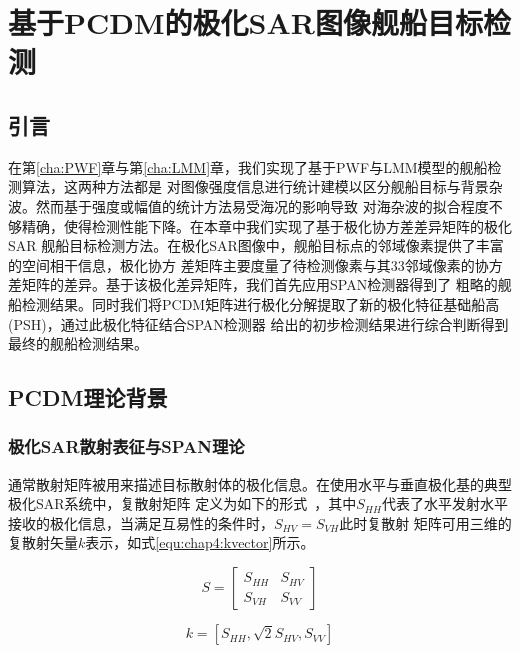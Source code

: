 \chapter{基于PCDM的极化SAR图像舰船目标检测}
\label{cha:PCDM}

\section{引言}
\label{sec:chap4:sec1}
在第\ref{cha:PWF}章与第\ref{cha:LMM}章，我们实现了基于PWF与LMM模型的舰船检测算法，这两种方法都是
对图像强度信息进行统计建模以区分舰船目标与背景杂波。然而基于强度或幅值的统计方法易受海况的影响导致
对海杂波的拟合程度不够精确，使得检测性能下降。在本章中我们实现了基于极化协方差差异矩阵的极化SAR
舰船目标检测方法。在极化SAR图像中，舰船目标点的邻域像素提供了丰富的空间相干信息，极化协方
差矩阵主要度量了待检测像素与其3\times 3邻域像素的协方差矩阵的差异。基于该极化差异矩阵，我们首先应用SPAN检测器得到了
粗略的舰船检测结果。同时我们将PCDM矩阵进行极化分解提取了新的极化特征基础船高(PSH)，通过此极化特征结合SPAN检测器
给出的初步检测结果进行综合判断得到最终的舰船检测结果。




\section{PCDM理论背景}
\label{sec:chap4:sec2}
\subsection{极化SAR散射表征与SPAN理论}
    通常散射矩阵被用来描述目标散射体的极化信息。在使用水平与垂直极化基的典型极化SAR系统中，复散射矩阵
    定义为如下的形式~\cite{book}，其中$S_{HH}$代表了水平发射水平接收的极化信息，当满足互易性的条件时，$S_{HV}=S_{VH}$此时复散射
    矩阵可用三维的复散射矢量$k$表示，如式\ref{equ:chap4:kvector}所示。

    \begin{equation}
        \label{equ:chap4:Smatrix}
        S = \left[ {\begin{array}{*{20}{c}}
        {{S_{HH}}}&{{S_{HV}}}\\
        {{S_{VH}}}&{{S_{VV}}}
        \end{array}} \right]
    \end{equation}

    \begin{equation}
        \label{equ:chap4:kvector}
        k = [{S_{HH}},\sqrt 2 {S_{HV}},{S_{VV}}]
    \end{equation}


